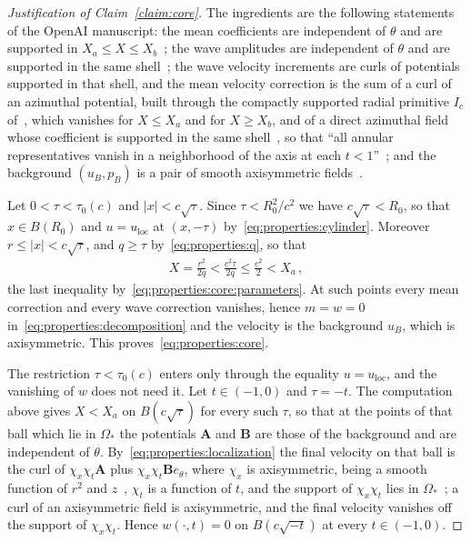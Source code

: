 \documentclass[11pt,reqno]{amsproc}
\numberwithin{equation}{section}
\theoremstyle{remark}
\begin{document}
\begin{proof}[Justification of Claim~\ref{claim:core}]
The ingredients are the following statements of the OpenAI manuscript: the mean coefficients are independent of $\theta$ and are supported in $X_a\le X\le X_b$~\cite[Definition~6.4 and equation~(6.24), p.~69]{OpenAIManuscript}; the wave amplitudes are independent of $\theta$ and are supported in the same shell~\cite[equations~(6.28)--(6.29) and Definition~6.5, p.~70]{OpenAIManuscript}; the wave velocity increments are curls of potentials supported in that shell, and the mean velocity correction is the sum of a curl of an azimuthal potential, built through the compactly supported radial primitive $I_c$ of~\cite[equation~(8.4) with Lemma~8.2, p.~90]{OpenAIManuscript}, which vanishes for $X\le X_a$ and for $X\ge X_b$, and of a direct azimuthal field whose coefficient is supported in the same shell~\cite[Definition~9.4 and equation~(9.9), p.~106]{OpenAIManuscript}, so that ``all annular representatives vanish in a neighborhood of the axis at each $t<1$''~\cite[p.~115]{OpenAIManuscript}; and the background $(u_B,p_B)$ is a pair of smooth axisymmetric fields~\cite[Proposition~5.5, p.~60]{OpenAIManuscript}.

Let $0<\tau<\tau_0(c)$ and $|x|<c\sqrt\tau$. Since $\tau<R_0^2/c^2$ we have $c\sqrt\tau<R_0$, so that $x\in B(R_0)$ and $u=u_{\mathrm{loc}}$ at $(x,-\tau)$ by~\eqref{eq:properties:cylinder}. Moreover $r\le|x|<c\sqrt\tau$, and $q\ge\tau$ by~\eqref{eq:properties:q}, so that
\begin{align*}
X=\frac{r^2}{2q}<\frac{c^2\tau}{2q}\le\frac{c^2}{2}<X_a
\,,
\end{align*}
the last inequality by~\eqref{eq:properties:core:parameters}. At such points every mean correction and every wave correction vanishes, hence $m=w=0$ in~\eqref{eq:properties:decomposition} and the velocity is the background $u_B$, which is axisymmetric. This proves~\eqref{eq:properties:core}.

The restriction $\tau<\tau_0(c)$ enters only through the equality $u=u_{\mathrm{loc}}$, and the vanishing of $w$ does not need it. Let $t\in(-1,0)$ and $\tau=-t$. The computation above gives $X<X_a$ on $B(c\sqrt\tau)$ for every such $\tau$, so that at the points of that ball which lie in $\Omega_*$ the potentials $\mathbf A$ and $\mathbf B$ are those of the background and are independent of $\theta$. By~\eqref{eq:properties:localization} the final velocity on that ball is the curl of $\chi_x\chi_t\mathbf A$ plus $\chi_x\chi_t\mathbf Be_\theta$, where $\chi_x$ is axisymmetric, being a smooth function of $r^2$ and $z$~\cite[p.~118]{OpenAIManuscript}, $\chi_t$ is a function of $t$, and the support of $\chi_x\chi_t$ lies in $\Omega_*$~\cite[p.~118]{OpenAIManuscript}; a curl of an axisymmetric field is axisymmetric, and the final velocity vanishes off the support of $\chi_x\chi_t$. Hence $w(\cdot,t)=0$ on $B(c\sqrt{-t})$ at every $t\in(-1,0)$.


\end{proof}
\end{document}
